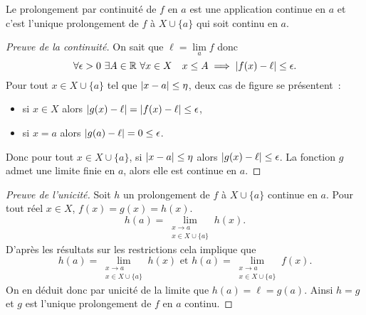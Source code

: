 \begin{prop}
  Le prolongement par continuité de $f$ en $a$ est une application continue en $a$ et c'est l'unique prolongement de $f$ à $X \cup \{a\}$ qui soit continu en $a$.
\end{prop}
\begin{proof}[Preuve de la continuité]
  On sait que $\ell=\lim\limits_{a}f$ donc
  \begin{equation}
    \forall \epsilon >0 \ \exists A \in \mathbb{R} \ \forall x \in X \quad x \leq A \implies \left\lvert f(x)-\ell\right\rvert \leq \epsilon.
  \end{equation}
  Pour tout $x \in X \cup \{a\}$ tel que $\left\lvert x-a\right\rvert \leq \eta$, deux cas de figure se présentent~:
  \begin{itemize}
  \item si $x \in X$ alors $\left\lvert g(x)-\ell\right\rvert=\left\lvert f(x)-\ell\right\rvert \leq \epsilon$,
  \item si $x=a$ alors $\left\lvert g(a)-\ell\right\rvert=0 \leq \epsilon$.
  \end{itemize}
  Donc pour tout $x \in X \cup \{a\}$, si $\left\lvert x-a\right\rvert \leq \eta$ alors $\left\lvert g(x)-\ell\right\rvert \leq \epsilon$. La fonction $g$ admet une limite finie en $a$, alors elle est continue en $a$.
\end{proof}
\begin{proof}[Preuve de l'unicité]
  Soit $h$ un prolongement de $f$ à $X \cup \{a\}$ continue en $a$. Pour tout réel $x \in X$, $f(x)=g(x)=h(x)$.
  \begin{equation}
    h(a)= \lim\limits_{\begin{array}{c} x \to a \\ x \in X\cup\{a\}\end{array}}h(x).
  \end{equation}
  D'après les résultats sur les restrictions cela implique que
  \begin{equation}
    h(a)= \lim\limits_{\begin{array}{c} x \to a \\ x \in X\cup\{a\}\end{array}}h(x) \text{~et~} h(a)= \lim\limits_{\begin{array}{c} x \to a \\ x \in X\cup\{a\}\end{array}}f(x).
  \end{equation}
  On en déduit donc par unicité de la limite que $h(a)=\ell=g(a)$. Ainsi $h=g$ et $g$ est l'unique prolongement de $f$ en $a$ continu.
\end{proof}

